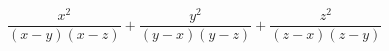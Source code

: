 \begin{ex}[type=expression]
	\begin{condition}
		\( \dfrac{x^2}{(x-y)(x-z)}+\dfrac{y^2}{(y-x)(y-z)}+\dfrac{z^2}{(z-x)(z-y)} \)
	\end{condition}
\end{ex}